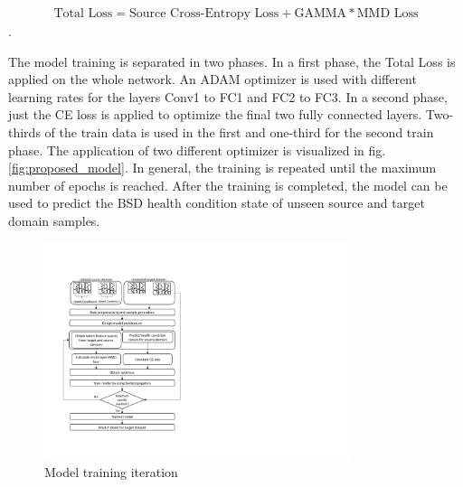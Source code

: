 \begin{align}
    \mbox{Total Loss} = \mbox{Source Cross-Entropy Loss} + \mbox{GAMMA} * \mbox{MMD Loss}
\end{align}.

The model training is separated in two phases. In a first phase, the Total Loss is applied on the whole network. An ADAM optimizer is used with different learning rates for the layers Conv1 to FC1 and FC2 to FC3. In a second phase, just the CE loss is applied to optimize the final two fully connected layers. Two-thirds of the train data is used in the first and one-third for the second train phase. The application of two different optimizer is visualized in fig. \ref{fig:proposed_model}. In general, the training is repeated until the maximum number of epochs is reached. After the training is completed, the model can be used to predict the BSD health condition state of unseen source and target domain samples. 

\begin{figure}[H]
  \centering
  \includegraphics[width=0.8\textwidth]{training_process_mmd.pdf}
  \caption {Model training iteration} \label{fig:Training_Process_MMD}
\end{figure}


